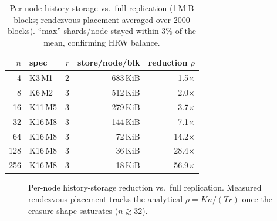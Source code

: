 \begin{table}[t]
\centering
\caption{Per-node history storage vs.\ full replication (1\,MiB blocks; rendezvous placement
averaged over 2000 blocks). ``max'' shards/node stayed within $3\%$ of the mean, confirming HRW
balance.}
\label{tab:storage}
\begin{tabular}{rlrrr}
\toprule
$n$ & spec & $r$ & store/node/blk & reduction $\rho$ \\
\midrule
4   & K3\,M1  & 2 & 683\,KiB & 1.5$\times$ \\
8   & K6\,M2  & 3 & 512\,KiB & 2.0$\times$ \\
16  & K11\,M5 & 3 & 279\,KiB & 3.7$\times$ \\
32  & K16\,M8 & 3 & 144\,KiB & 7.1$\times$ \\
64  & K16\,M8 & 3 & 72\,KiB  & 14.2$\times$ \\
128 & K16\,M8 & 3 & 36\,KiB  & 28.4$\times$ \\
256 & K16\,M8 & 3 & 18\,KiB  & 56.9$\times$ \\
\bottomrule
\end{tabular}
\end{table}

\begin{figure}[t]
\centering
{}
\caption{Per-node history-storage reduction vs.\ full replication. Measured rendezvous placement
tracks the analytical $\rho=Kn/(Tr)$ once the erasure shape saturates ($n\gtrsim32$).}
\label{fig:storagecurve}
\end{figure}

